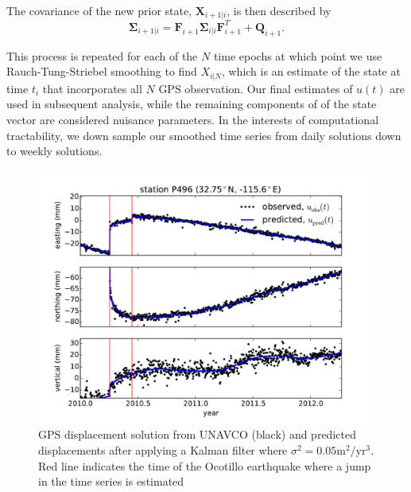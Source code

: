 \documentclass[12pt]{article}
\begin{document}
The covariance of the new prior state, $\mathbf{X}_{i+1|i}$, is then described by
\begin{equation}
  \mathbf{\Sigma}_{i+1|i} = \mathbf{F}_{i+1}\mathbf{\Sigma}_{i|i}\mathbf{F}^T_{i+1} + \mathbf{Q}_{i+1}.
\end{equation}

This process is repeated for each of the $N$ time epochs at which point we use Rauch-Tung-Striebel smoothing to find $X_{i|N}$, which is an estimate of the state at time $t_i$ that incorporates all $N$ GPS observation.  Our final estimates of $u(t)$ are used in subsequent analysis, while the remaining components of of the state vector are considered nuisance parameters. In the interests of computational tractability, we down sample our smoothed time series from daily solutions down to weekly solutions.


\begin{figure}
\includegraphics[scale=0.6]{Figures/figure_1}
\centering
\caption{GPS displacement solution from UNAVCO (black) and predicted displacements after applying a Kalman filter where $\sigma^2=0.05 \mathrm{m}^2/\mathrm{yr}^3$. Red line indicates the time of the Ocotillo earthquake where a jump in the time series is estimated}
\label{P496Fit}
\end{figure}
\end{document}
